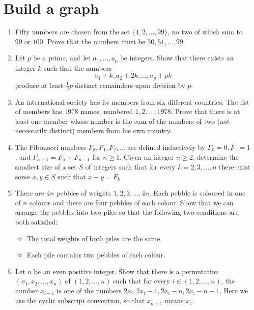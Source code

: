 \documentclass{article}
\begin{document}
\section{Build a graph}
\begin{enumerate}
	\item Fifty numbers are chosen from the set $\{1,2,\ldots,99\}$, no two of
	      which sum to $99$ or $100$. Prove that the numbers must be
	      $50,51,\ldots,99$.
	\item Let $p$ be a prime, and let $a_1, \dots, a_p$ be integers. Show that
	      there exists an integer $k$ such that the numbers
	      \[a_1 + k, a_2 + 2k, \dots, a_p + pk\]produce at least $\tfrac{1}{2} p$
	      distinct remainders upon division by $p$.
	\item An international society has its members from six different
	      countries. The list of members has 1978 names, numbered $1, 2,
		      \ldots, 1978$. Prove that there is at least one member whose
	      number is the sum of the numbers of two (not necessarily
	      distinct) members from his own country.
	\item The Fibonacci numbers $F_0, F_1, F_2,\ldots$ are defined inductively
	      by $F_0=0, F_1=1$, and $F_{n+1}=F_n+F_{n-1}$ for $n \ge 1$. Given an
	      integer $n \ge 2$, determine the smallest size of a set $S$ of integers
	      such that for every $k=2, 3, \ldots , n$ there exist some $x, y \in S$
	      such that $x-y=F_k$.
	\item  There are $4n$ pebbles of weights $1, 2, 3, \dots, 4n$. Each pebble
	      is coloured in one of $n$ colours and there are four pebbles of each
	      colour. Show that we can arrange the pebbles into two piles so that the
	      following two conditions are both satisfied:

	      \begin{itemize}
		      \item
		            The total weights of both piles are the same.
		      \item
		            Each pile contains two pebbles of each colour.
	      \end{itemize}
	\item Let $n$ be an even positive integer. Show that there is a permutation
	      $(x_1, x_2, \ldots, x_n)$ of $(1, 2, \ldots, n)$ such that for every $i \in (1, 2, \ldots,
		      n)$,
	      the
	      number $x_{i+1}$ is one of the numbers $2x_i, 2x_i-1, 2x_i-n, 2x_i-n-1$. Here
	      we use the cyclic subscript convention, so that $x_{n+1}$ means $x_1$.
\end{enumerate}
\end{document}
